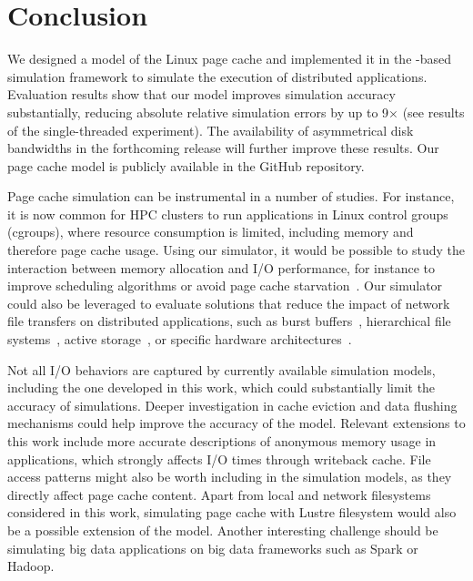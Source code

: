\chapter{Conclusion}
\label{conclusion}

We designed a model of the Linux page cache and implemented it in the
\simgrid-based \wrench simulation framework to simulate the execution
of distributed applications.
Evaluation results show that our model improves simulation accuracy
substantially, reducing absolute relative simulation errors by up to
9$\times$ (see results of the single-threaded experiment). The
availability of asymmetrical disk bandwidths in the forthcoming
\simgrid release will further improve these results.
Our page cache model is publicly available in the \wrench GitHub
repository.

Page cache simulation can be instrumental in a number of studies. For
instance, it is now common for HPC clusters to run applications in
Linux control groups (cgroups), where resource consumption is limited,
including memory and therefore page cache usage. Using our simulator,
it would be possible to study the interaction between memory allocation
and I/O performance, for instance to improve scheduling algorithms or
avoid page cache starvation~\cite{zhuang2017}. Our simulator could also
be leveraged to evaluate solutions that reduce the impact of network
file transfers on distributed applications, such as burst
buffers~\cite{ferreiradasilva-fgcs-bb-2019}, hierarchical file
systems~\cite{islam2015triple}, active storage~\cite{5496981}, or
specific hardware architectures~\cite{hayot2020performance}. 

Not all I/O behaviors are captured by currently available simulation models,
including the one developed in this work, 
which could substantially limit the accuracy of simulations.
Deeper investigation in cache eviction and data flushing mechanisms 
could help improve the accuracy of the model. 
Relevant extensions to this work include more
accurate descriptions of anonymous memory usage in applications, 
which strongly affects I/O times through writeback cache. 
File access patterns might also be worth including in the simulation models,
as they directly affect page cache content.
Apart from local and network filesystems considered in this work, 
simulating page cache with Lustre filesystem would also be a possible 
extension of the model. 
Another interesting challenge should be simulating big data applications 
on big data frameworks such as Spark or Hadoop.

